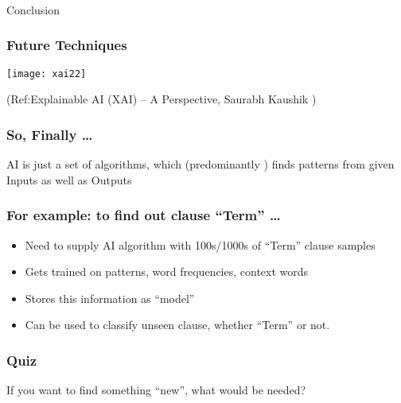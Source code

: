 \begin{frame}[fragile]\frametitle{}
\begin{center}
{\Large Conclusion}
\end{center}
\end{frame}


\begin{frame}[fragile]\frametitle{Future Techniques}
\begin{center}
\texttt{[image: xai22]}
\end{center}

\tiny{(Ref:Explainable AI (XAI) – A Perspective, Saurabh Kaushik  )}
\end{frame}

\begin{frame}[fragile]\frametitle{So, Finally \ldots}

\begin{center}
AI is just a set of algorithms, 
which (predominantly ) finds patterns from given Inputs as well as Outputs
\end{center}
\end{frame}

\begin{frame}[fragile]\frametitle{For example: to find out clause ``Term'' \ldots}
\begin{itemize}
\item Need to supply AI algorithm with 100s/1000s of ``Term'' clause samples
\item Gets trained on patterns, word frequencies, context words
\item Stores this information as ``model''
\item Can be used to classify unseen clause, whether ``Term'' or not.
\end{itemize}
\end{frame}

\begin{frame}[fragile]\frametitle{Quiz}
If you want to find something ``new'', what would be needed?
\end{frame}

